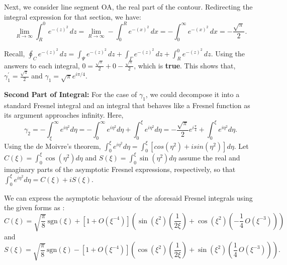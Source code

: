 \documentclass{article}
\begin{document}
Next, we consider line segment OA, the real part of the contour. Redirecting the integral expression for that section, we have:
\begin{equation}
 \lim_{{R \to \infty}} \int_{R}^{0} e^{-(z)^{2}} \, dz = \lim_{{R \to \infty}} - \int_{0}^{R} e^{-(x)^{2}} \, dx = - \int_{0}^{\infty} e^{-(x)^{2}} \, dx = -\frac{\sqrt{\pi}}{2}.
\end{equation}

Recall, $\oint_{C} e^{-(z)^{2}} \, dz = \int_{\Psi} e^{-(z)^{2}} \, dz + \int_{\Gamma} e^{-(z)^{2}} \, dz + \int_{R}^{0} e^{-(z)^{2}} \, dz.$ Using the answers to each integral, $0 = \frac{\sqrt{\pi}}{2} + 0 - \frac{\sqrt{\pi}}{2}$, which is \textbf{true}. This shows that, $\gamma_{1}^{'} = \frac{\sqrt{\pi}}{2}$ and $\gamma_{1} = \sqrt{\pi}e^{i\pi/4}$.

\vspace{3}

\textbf{Second Part of Integral:}
For the case of $\gamma_{1}$, we could decompose it into a standard Fresnel integral and an integral that behaves like a Fresnel function as its argument approaches infinity. Here,
\begin{equation}
\gamma_{2} = - \int_{\xi}^{\infty}e^{i\eta^{2}}d\eta = -\int_{0}^{\infty}e^{i\eta^{2}}d\eta + \int_{0}^{\xi}e^{i\eta^{2}}d\eta = -\frac{\sqrt{\pi}}{2}e^{i\frac{\pi}{4}} + \int_{0}^{\xi}e^{i\eta^{2}}d\eta.
\end{equation}
Using the de Moivre's theorem, $\int_{0}^{\xi}e^{i\eta^{2}}d\eta = \int_{0}^{\xi}[cos(\eta^{2}) + isin(\eta^{2})]d\eta$. Let $C(\xi) = \int_{0}^{\xi}\cos(\eta^{2})d\eta$ and $S(\xi) =  \int_{0}^{\xi}\sin(\eta^{2})d\eta$ assume the real and imaginary parts of the asymptotic Fresnel expressions, respectively, so that $\int_{0}^{\xi}e^{i\eta^{2}}d\eta = C(\xi) + iS(\xi)$.

\vspace{5}

We can express the asymptotic behaviour of the aforesaid Fresnel integrals using the given forms as \cite{abramowitz1968handbook}\cite{enwiki:1181389148}\cite{wolfram-alpha-notebook}: 
\begin{equation}
C(\xi) = \sqrt{\frac{\pi}{8}}\,\text{sgn}(\xi) + \left[1 + O\left(\xi^{-4}\right)\right]\left(\sin(\xi^2)\left(\frac{1}{2\xi}\right) + \cos(\xi^2)\left(-\frac{1}{4}\,O\left(\xi^{-3}\right)\right)\right)
\end{equation}
and
\begin{equation}
S(\xi) = \sqrt{\frac{\pi}{8}}\,\text{sgn}(\xi) - \left[1 + O\left(\xi^{-4}\right)\right]\left(\cos(\xi^2)\left(\frac{1}{2\xi}\right) + \sin(\xi^2)\left(\frac{1}{4}\,O\left(\xi^{-3}\right)\right)\right).
\end{equation}
\end{document}
